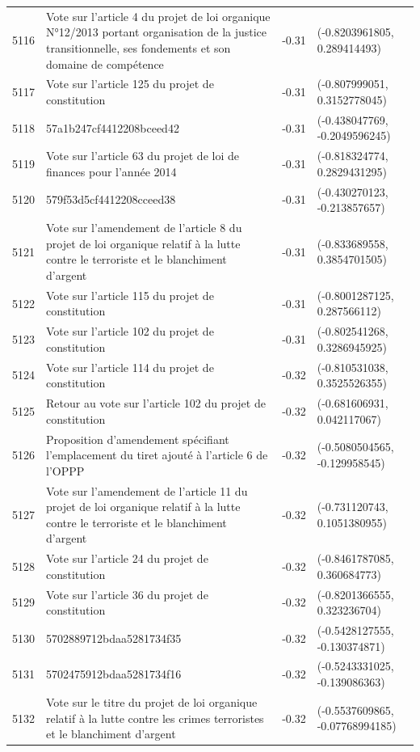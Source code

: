 \begin{table}[ht]
\begin{tabular}{rlrl}
  5116 & Vote sur l'article 4 du projet de loi organique N°12/2013 portant organisation de la justice transitionnelle, ses fondements et son domaine de compétence & -0.31 & (-0.8203961805, 0.289414493) \\ 
  5117 & Vote sur l'article 125 du projet de constitution & -0.31 & (-0.807999051, 0.3152778045) \\ 
  5118 & 57a1b247cf4412208bceed42 & -0.31 & (-0.438047769, -0.2049596245) \\ 
  5119 & Vote sur l'article 63 du projet de loi de finances pour l'année 2014 & -0.31 & (-0.818324774, 0.2829431295) \\ 
  5120 & 579f53d5cf4412208cceed38 & -0.31 & (-0.430270123, -0.213857657) \\ 
  5121 & Vote sur l'amendement de l'article 8 du projet de loi organique relatif à la lutte contre le terroriste et le blanchiment d'argent & -0.31 & (-0.833689558, 0.3854701505) \\ 
  5122 & Vote sur l'article 115 du projet de constitution & -0.31 & (-0.8001287125, 0.287566112) \\ 
  5123 & Vote sur l'article 102 du projet de constitution & -0.31 & (-0.802541268, 0.3286945925) \\ 
  5124 & Vote sur l'article 114 du projet de constitution & -0.32 & (-0.810531038, 0.3525526355) \\ 
  5125 & Retour au vote sur l'article 102 du projet de constitution & -0.32 & (-0.681606931, 0.042117067) \\ 
  5126 & Proposition d'amendement spécifiant l'emplacement du tiret ajouté à l'article 6 de l'OPPP & -0.32 & (-0.5080504565, -0.129958545) \\ 
  5127 & Vote sur l'amendement de l'article 11 du projet de loi organique relatif à la lutte contre le terroriste et le blanchiment d'argent & -0.32 & (-0.731120743, 0.1051380955) \\ 
  5128 & Vote sur l'article 24 du projet de constitution & -0.32 & (-0.8461787085, 0.360684773) \\ 
  5129 & Vote sur l'article 36 du projet de constitution & -0.32 & (-0.8201366555, 0.323236704) \\ 
  5130 & 5702889712bdaa5281734f35 & -0.32 & (-0.5428127555, -0.130374871) \\ 
  5131 & 5702475912bdaa5281734f16 & -0.32 & (-0.5243331025, -0.139086363) \\ 
  5132 & Vote sur le titre du projet de loi organique relatif à la lutte contre les crimes terroristes et le blanchiment d'argent & -0.32 & (-0.5537609865, -0.07768994185) \\ 

\end{tabular}
\end{table}
